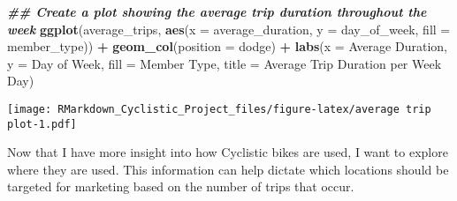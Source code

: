 \documentclass[
]{article}
\newenvironment{Shaded}{\begin{snugshade}}{\end{snugshade}}
\newcommand{\AttributeTok}[1]{\textcolor[rgb]{0.13,0.29,0.53}{#1}}
\newcommand{\ConstantTok}[1]{\textcolor[rgb]{0.56,0.35,0.01}{#1}}
\newcommand{\DecValTok}[1]{\textcolor[rgb]{0.00,0.00,0.81}{#1}}
\newcommand{\DocumentationTok}[1]{\textcolor[rgb]{0.56,0.35,0.01}{\textbf{\textit{#1}}}}
\newcommand{\FunctionTok}[1]{\textcolor[rgb]{0.13,0.29,0.53}{\textbf{#1}}}
\newcommand{\NormalTok}[1]{#1}
\newcommand{\OtherTok}[1]{\textcolor[rgb]{0.56,0.35,0.01}{#1}}
\newcommand{\SpecialCharTok}[1]{\textcolor[rgb]{0.81,0.36,0.00}{\textbf{#1}}}
\newcommand{\StringTok}[1]{\textcolor[rgb]{0.31,0.60,0.02}{#1}}
\begin{document}
\begin{Shaded}
\begin{Highlighting}[]
\DocumentationTok{\#\# Create a plot showing the average trip duration throughout the week}
\FunctionTok{ggplot}\NormalTok{(average\_trips, }\FunctionTok{aes}\NormalTok{(}\AttributeTok{x =}\NormalTok{ average\_duration, }\AttributeTok{y =}\NormalTok{ day\_of\_week, }\AttributeTok{fill =}\NormalTok{ member\_type)) }\SpecialCharTok{+}
\FunctionTok{geom\_col}\NormalTok{(}\AttributeTok{position =} \StringTok{\textquotesingle{}dodge\textquotesingle{}}\NormalTok{) }\SpecialCharTok{+}
\FunctionTok{labs}\NormalTok{(}\AttributeTok{x =} \StringTok{\textquotesingle{}Average Duration\textquotesingle{}}\NormalTok{, }\AttributeTok{y =} \StringTok{\textquotesingle{}Day of Week\textquotesingle{}}\NormalTok{, }\AttributeTok{fill =} \StringTok{\textquotesingle{}Member Type\textquotesingle{}}\NormalTok{, }\AttributeTok{title =} \StringTok{\textquotesingle{}Average Trip Duration per Week Day\textquotesingle{}}\NormalTok{)}
\end{Highlighting}
\end{Shaded}

\texttt{[image: RMarkdown\_Cyclistic\_Project\_files/figure-latex/average trip plot-1.pdf]}

Now that I have more insight into how Cyclistic bikes are used, I want
to explore where they are used. This information can help dictate which
locations should be targeted for marketing based on the number of trips
that occur.

\begin{Shaded}
\end{Shaded}
\end{document}
